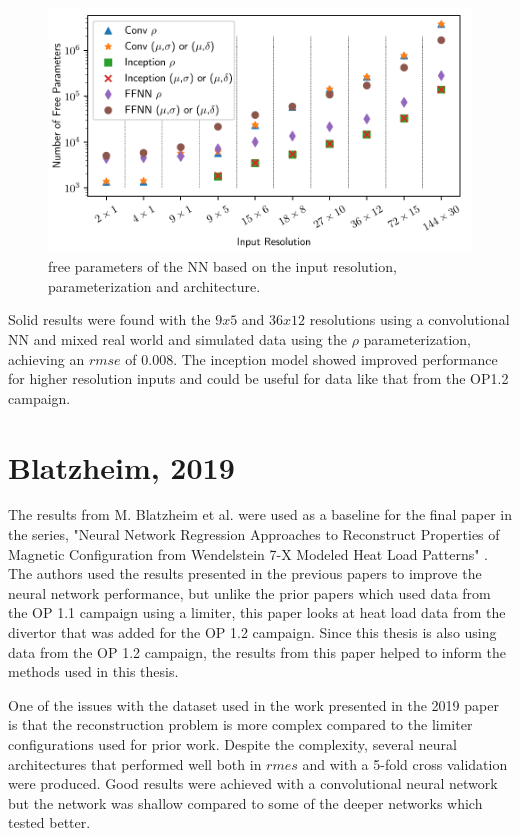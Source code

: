 \begin{figure}[!htb]
    \centering
    \includegraphics[width = \textwidth]{images/daniel-input-parameters.png}
    \caption{free parameters of the NN based on the input resolution, parameterization and architecture.} \label{fig:daniel-input-parameters}
\end{figure}

Solid results were found with the $9x5$ and $36x12$ resolutions using a convolutional NN and mixed real world and simulated data using the $\rho$ parameterization, achieving an $rmse$ of 0.008. The inception model showed improved performance for higher resolution inputs and could be useful for data like that from the OP1.2 campaign.

\section{Blatzheim, 2019}

The results from M. Blatzheim et al. were used as a baseline for the final paper in the series, "Neural Network Regression Approaches to Reconstruct Properties of Magnetic Configuration from Wendelstein 7-X Modeled Heat Load Patterns" \cite{Blatzheim_2019}. The authors used the results presented in the previous papers to improve the neural network performance, but unlike the prior papers which used data from the OP 1.1 campaign using a limiter, this paper looks at heat load data from the divertor that was added for the OP 1.2 campaign. Since this thesis is also using data from the OP 1.2 campaign, the results from this paper helped to inform the methods used in this thesis.

One of the issues with the dataset used in the work presented in the 2019 paper is that the reconstruction problem is more complex compared to the limiter configurations used for prior work. Despite the complexity, several neural architectures that performed well both in $rmes$ and with a 5-fold cross validation were produced. Good results were achieved with a convolutional neural network but the network was shallow compared to some of the deeper networks which tested better.